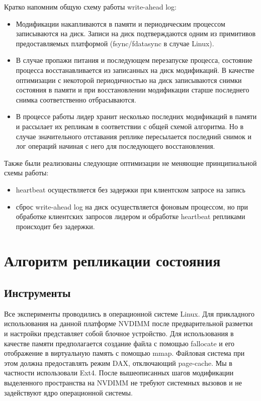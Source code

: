 \documentclass[pdftex,ptm,12pt,a4paper]{report}
\theoremstyle{definition}
\begin{document}
Кратко напомним общую схему работы write-ahead log:
\begin{itemize}
    \item Модификации накапливаются в памяти и периодическим процессом записываются на диск. Записи на диск подтверждаются одним из примитивов предоставляемых платформой (fsync/fdatasync в случае Linux).
    \item В случае пропажи питания и последующем перезапуске процесса, состояние процесса восстанавливается из записанных на диск модификаций. В качестве оптимизации
        с некоторой периодичностью на диск записываются снимки состояния в памяти и при восстановлении модификации старше последнего снимка соответственно отбрасываются.
    \item В процессе работы лидер хранит несколько последних модификаций в памяти и рассылает их репликам в соответствии с общей схемой алгоритма.
        Но в случае значительного отставания реплике пересылается последний снимок и лог операций начиная с него для последующего восстановления.
\end{itemize}

Также были реализованы следующие оптимизации не меняющие принципиальной схемы работы:
\begin{itemize}
\item heartbeat осуществляется без задержки при клиентском запросе на запись
\item сброс write-ahead log на диск осуществляется фоновым процессом, но при обработке клиентских запросов лидером и обработке heartbeat репликами происходит без задержки.
\end{itemize}

\chapter{Алгоритм репликации состояния}
\section{Инструменты}

Все эксперименты проводились в операционной системе Linux.  Для прикладного использования на данной платформе NVDIMM
после предварительной разметки и настройки представляет собой блочное устройство. Для использования в качестве памяти предполагается создание файла с помощью fallocate
и его отображение в виртуальную память с помощью mmap. Файловая система при этом должна предоставлять режим DAX, отключающий page-cache. Мы в частности использовали Ext4.
После вышеописанных шагов модификации выделенного пространства на NVDIMM не требуют системных вызовов и не задействуют ядро операционной системы.
\end{document}
